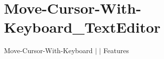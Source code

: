 \chapter{Move-\/\+Cursor-\/\+With-\/\+Keyboard\+\_\+\+Text\+Editor }
\hypertarget{md__docs_2_text_editor_2_features_2_move-_cursor-_with-_keyboard___text_editor}{}\label{md__docs_2_text_editor_2_features_2_move-_cursor-_with-_keyboard___text_editor}
Move-\/\+Cursor-\/\+With-\/\+Keyboard \texorpdfstring{$\vert$}{|}  \texorpdfstring{$\vert$}{|} Features



 